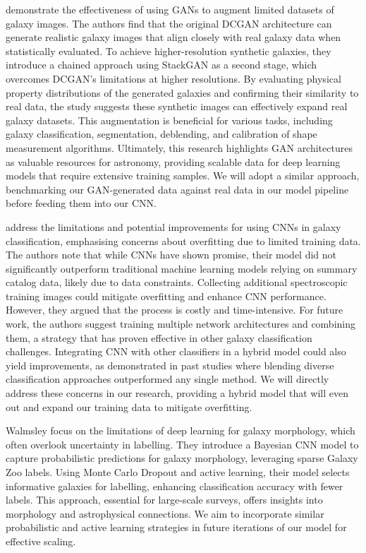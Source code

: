 \documentclass[10pt,twocolumn,letterpaper]{article}
\begin{document}
\citet{Fussell19} demonstrate the effectiveness of using GANs to augment limited datasets of galaxy images. 
The authors find that the original DCGAN architecture can generate realistic galaxy images that align closely with real galaxy data when statistically evaluated. 
To achieve higher-resolution synthetic galaxies, they introduce a chained approach using StackGAN as a second stage, which overcomes DCGAN’s limitations at higher resolutions. 
By evaluating physical property distributions of the generated galaxies and confirming their similarity to real data, the study suggests these synthetic images can effectively expand real galaxy datasets. 
This augmentation is beneficial for various tasks, including galaxy classification, segmentation, deblending, and calibration of shape measurement algorithms. 
Ultimately, this research highlights GAN architectures as valuable resources for astronomy, providing scalable data for deep learning models that require extensive training samples. 
We will adopt a similar approach, benchmarking our GAN-generated data against real data in our model pipeline before feeding them into our CNN. 

\citet{Kim16} address the limitations and potential improvements for using CNNs in galaxy classification, emphasising concerns about overfitting due to limited training data. 
The authors note that while CNNs have shown promise, their model did not significantly outperform traditional machine learning models relying on summary catalog data, likely due to data constraints. 
Collecting additional spectroscopic training images could mitigate overfitting and enhance CNN performance. 
However, they argued that the process is costly and time-intensive. 
For future work, the authors suggest training multiple network architectures and combining them, a strategy that has proven effective in other galaxy classification challenges. 
Integrating CNN with other classifiers in a hybrid model could also yield improvements, as demonstrated in past studies where blending diverse classification approaches outperformed any single method. 
We will directly address these concerns in our research, providing a hybrid model that will even out and expand our training data to mitigate overfitting.

Walmsley \citet{Walmsley2019} focus on the limitations of deep learning for galaxy morphology, which often overlook uncertainty in labelling. 
They introduce a Bayesian CNN model to capture probabilistic predictions for galaxy morphology, leveraging sparse Galaxy Zoo labels. 
Using Monte Carlo Dropout and active learning, their model selects informative galaxies for labelling, enhancing classification accuracy with fewer labels. 
This approach, essential for large-scale surveys, offers insights into morphology and astrophysical connections. 
We aim to incorporate similar probabilistic and active learning strategies in future iterations of our model for effective scaling.
\end{document}
